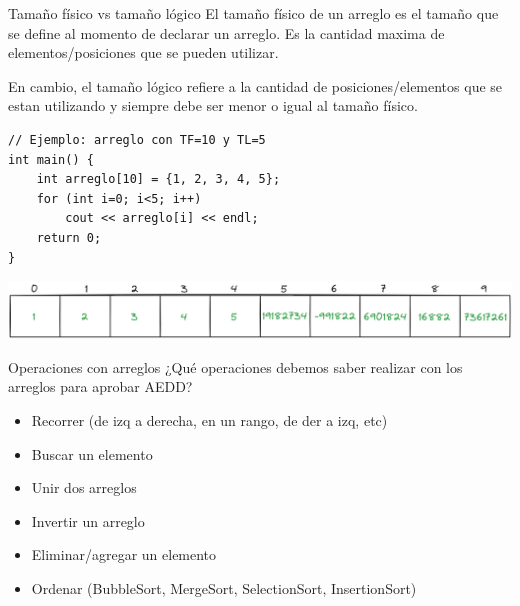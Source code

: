 \documentclass[12pt]{beamer}
\begin{document}
\begin{frame}[fragile]{Tamaño físico vs tamaño lógico}
    El \alert{tamaño físico} de un arreglo es el tamaño que se define al momento de declarar un arreglo. Es la cantidad maxima de elementos/posiciones que se pueden utilizar.
    
    \medskip
    
    En cambio, el \alert{tamaño lógico} refiere a la cantidad de posiciones/elementos que se estan utilizando y siempre \alert{debe ser menor o igual al tamaño físico}.

\begin{lstlisting}[]
// Ejemplo: arreglo con TF=10 y TL=5
int main() {
    int arreglo[10] = {1, 2, 3, 4, 5};
    for (int i=0; i<5; i++)
        cout << arreglo[i] << endl;
    return 0;
}
\end{lstlisting}
    \includegraphics[width=\textwidth]{tamlogico.png}
\end{frame}

\begin{frame}{Operaciones con arreglos}
    ¿Qué operaciones debemos saber realizar con los arreglos para aprobar AEDD?
    \begin{itemize}
        \item Recorrer (de izq a derecha, en un rango, de der a izq, etc)
        \item Buscar un elemento
        \item Unir dos arreglos
        \item Invertir un arreglo
        \item Eliminar/agregar un elemento
        \item Ordenar (BubbleSort, MergeSort, SelectionSort, InsertionSort)
    \end{itemize}
\end{frame}
\end{document}
